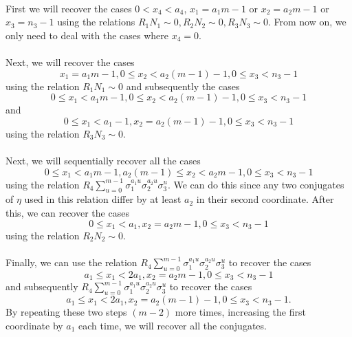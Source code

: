 \documentclass[12pt,a4paper]{article}
\theoremstyle{definition}
\begin{document}
\paragraph*{}
First we will recover the cases $0<x_4<a_4$, $x_1=a_1m-1$ or $x_2=a_2m-1$ or $x_3=n_3-1$ using the relations $R_1N_1\sim 0, R_2N_2\sim 0, R_3N_3\sim 0$. From now on, we only need to deal with the cases where $x_4=0$.
\paragraph*{}
Next, we will recover the cases $$x_1=a_1m-1, 0\leq x_2 < a_2(m-1)-1, 0\leq x_3 <n_3-1$$ using the relation $R_1N_1\sim 0$ and subsequently the cases $$0\leq x_1 < a_1m-1, 0\leq x_2 < a_2(m-1)-1, 0\leq x_3 <n_3-1$$ and $$0\leq x_1 < a_1-1, x_2 = a_2(m-1)-1, 0\leq x_3 <n_3-1$$ using the relation $R_3N_3\sim 0$.
\paragraph*{}
Next, we will sequentially recover all the cases $$0\leq x_1 < a_1m-1, a_2(m-1)\leq x_2 < a_2m-1, 0\leq x_3 <n_3-1$$
using the relation $R_4\sum_{u=0}^{m-1}\sigma_1^{a_1u}\sigma_2^{a_2u}\sigma_3^u$. We can do this since any two conjugates of $\eta$ used in this relation differ by at least $a_2$ in their second coordinate. After this, we can recover the cases $$0\leq x_1 < a_1, x_2 = a_2m-1, 0\leq x_3 <n_3-1$$ using the relation $R_2N_2\sim 0$.
\paragraph*{}
Finally, we can use the relation $R_4\sum_{u=0}^{m-1}\sigma_1^{a_1u}\sigma_2^{a_2u}\sigma_3^u$ to recover the cases $$a_1 \leq x_1 <2a_1, x_2 =a_2m-1, 0\leq x_3 <n_3-1$$ and subsequently $R_4\sum_{u=0}^{m-1}\sigma_1^{a_1u}\sigma_2^{a_2u}\sigma_3^u$ to recover the cases $$a_1 \leq x_1 <2a_1, x_2 =a_2(m-1)-1, 0\leq x_3 <n_3-1.$$ By repeating these two steps $(m-2)$ more times, increasing the first coordinate by $a_1$ each time, we will recover all the conjugates.
\end{document}
